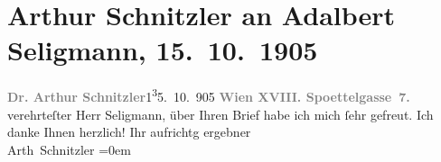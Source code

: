 

         
         \renewcommand{\erwaehntePersonen}{Personen: Adalbert Franz Seligmann}
         \renewcommand{\erwaehnteOrte}{Orte: Edmund-Weiß-Gasse, Wien}
         \renewcommand{\erwaehnteWerke}{}
               \section[Arthur Schnitzler an Adalbert Seligmann, 15. 10. 1905]{ Arthur Schnitzler an Adalbert Seligmann, 15. 10. 1905}\nopagebreak{}\rehead{ }\begin{ledgroupsized}[t]{13cm}\normalsize\beginnumbering \toendnotes[C]{\smallbreak\pagebreak[2]} 
\pstart
           \noindent{}{\pb}\textcolor{gray}{\textbf{Dr. Arthur Schnitzler}}\hfill 1\substVorne{}\textsuperscript{3}\substDazwischen{}5\substHinten{}. 10. 905\pend
           \pstart
           \textcolor{gray}{\textbf{Wien XVIII. Spoettelgasse 7.}}\pend
           \pstart
           verehrteſter Herr Seligmann, über Ihren Brief habe ich mich ſehr
               gefreut. Ich danke Ihnen herzlich!\pend
           \pstart
           Ihr aufrichtg ergebner{\\[\baselineskip]}\spacefill\mbox{Arth Schnitzler}\pend
           \leftskip=0em{}
         
         \endnumbering{}\end{ledgroupsized}  \newcommand{\dateiname}{L01564}\newcommand{\titel}{Arthur Schnitzler an Adalbert Seligmann, 15. 10. 1905}\newcommand{\editorInnen}{Martin Anton Müller und Gerd-Hermann Susen}
      